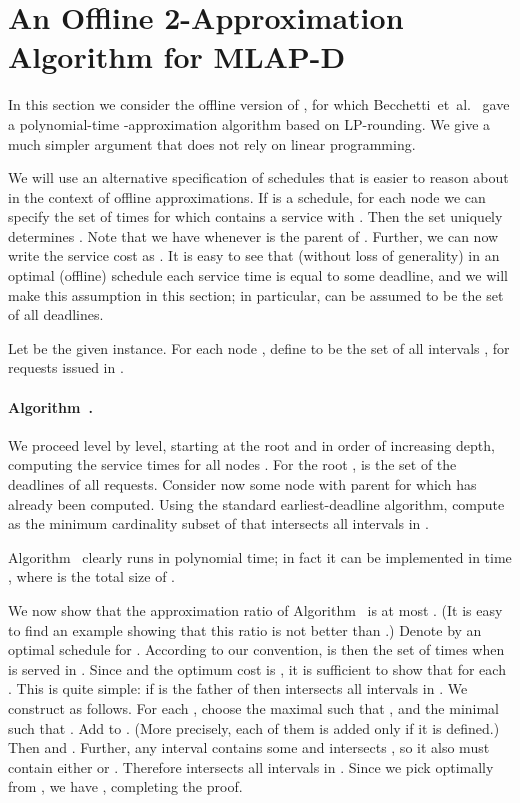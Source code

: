 \documentclass[a4paper]{article}
\newcommand{\etal}{et~al.}
\newcommand{\MLAPD}{\mbox{\rm\textsf{MLAP-D}}}
\begin{document}
\section{An Offline 2-Approximation Algorithm for {\MLAPD}}
\label{sec: mlap with deadlines}

In this section we consider the offline version of , for which Becchetti~\etal~\cite{packet-aggregation-becchetti}
gave a polynomial-time -approximation algorithm based on LP-rounding. We give a
much simpler argument that does not rely on linear programming. 

We will use an alternative specification of schedules that
is easier to reason about in the context of offline approximations.
If  is a schedule, for each node
 we can specify the set  of times  for which
 contains a service  with . Then the set
 uniquely determines .  Note
that we have  whenever  is the parent
of .  Further, we can now write the service cost as
.  It is easy to
see that (without loss of generality) in an optimal (offline) schedule
 each service time is equal to some deadline, and we will
make this assumption in this section; in particular,
 can be assumed to be the set of all deadlines.

Let  be the given instance. For each node , define  to be the set of all intervals , 
for requests  issued in . 


\paragraph{Algorithm~.}

We proceed level by level, starting at the root and in order of increasing depth, computing the service 
times  for all nodes . 
For the root ,  is the set of the deadlines of all requests.
Consider now some node  with parent  for which  has already been computed. 
Using the standard earliest-deadline algorithm, compute  as the minimum cardinality subset of 
that intersects all intervals in .

\medskip


Algorithm~ clearly runs in polynomial time; in fact it can be implemented in time 
, where  is the total size of .

We now show that the approximation ratio of Algorithm~ is at most . (It is easy to find an
example showing that this ratio is not better than .)
Denote by  an optimal schedule for . According to our
convention,  is then the set of times when  is served in . Since
 and the optimum cost 
is , it
is sufficient to show that  for each .
This is quite simple: if  is the father of  then  intersects all intervals in . 
We construct  as follows.
For each , choose the maximal  such that  , and
the minimal  such that  .
Add  to . (More precisely, each of them is added only if it is defined.)
Then   and .
Further, any interval  contains some  and intersects ,
so it also must contain either  or . Therefore   intersects all intervals in . Since
we pick  optimally from , we have ,
completing the proof.
\end{document}
